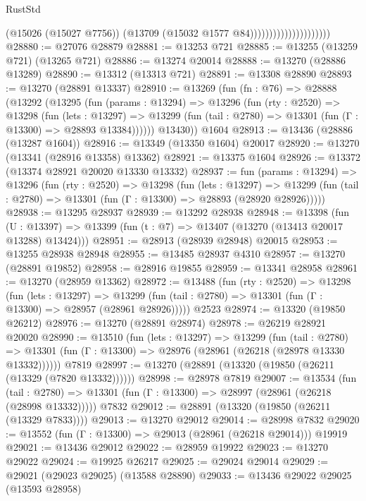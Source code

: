 \begin{lexlean}{RustStd}
\begin{coremodule}
                                          (@15026 (@15027 @7756))
                                          (@13709 (@15032 @1577 @84)))))))))))))))))))))
@28880 := @27076 @28879
@28881 := @13253 @721
@28885 := @13255 (@13259 @721) (@13265 @721)
@28886 := @13274 @20014
@28888 := @13270 (@28886 @13289)
@28890 := @13312 (@13313 @721)
@28891 := @13308 @28890
@28893 := @13270 (@28891 @13337)
@28910 := @13269
    (fun (fn : @76) =>
    @28888
      (@13292
        (@13295
          (fun (params : @13294) =>
          @13296
            (fun (rty : @2520) =>
            @13298
              (fun (lets : @13297) =>
              @13299 (fun (tail : @2780) => @13301 (fun (Γ : @13300) => @28893 @13384))))))
        @13430))
    @1604
@28913 := @13436 (@28886 (@13287 @1604))
@28916 := @13349 (@13350 @1604) @20017
@28920 := @13270 (@13341 (@28916 @13358) @13362)
@28921 := @13375 @1604
@28926 := @13372 (@13374 @28921 @20020 @13330 @13332)
@28937 := fun (params : @13294) =>
  @13296
    (fun (rty : @2520) =>
    @13298
      (fun (lets : @13297) =>
      @13299 (fun (tail : @2780) => @13301 (fun (Γ : @13300) => @28893 (@28920 @28926)))))
@28938 := @13295 @28937
@28939 := @13292 @28938
@28948 := @13398
    (fun (U : @13397) => @13399 (fun (t : @7) => @13407 (@13270 (@13413 @20017 @13288) @13424)))
@28951 := @28913 (@28939 @28948) @20015
@28953 := @13255 @28938 @28948
@28955 := @13485 @28937 @4310
@28957 := @13270 (@28891 @19852)
@28958 := @28916 @19855
@28959 := @13341 @28958
@28961 := @13270 (@28959 @13362)
@28972 := @13488
    (fun (rty : @2520) =>
    @13298
      (fun (lets : @13297) =>
      @13299 (fun (tail : @2780) => @13301 (fun (Γ : @13300) => @28957 (@28961 @28926)))))
    @2523
@28974 := @13320 (@19850 @26212)
@28976 := @13270 (@28891 @28974)
@28978 := @26219 @28921 @20020
@28990 := @13510
    (fun (lets : @13297) =>
    @13299
      (fun (tail : @2780) =>
      @13301 (fun (Γ : @13300) => @28976 (@28961 (@26218 (@28978 @13330 @13332))))))
    @7819
@28997 := @13270 (@28891 (@13320 (@19850 (@26211 (@13329 (@7820 @13332))))))
@28998 := @28978 @7819
@29007 := @13534
    (fun (tail : @2780) => @13301 (fun (Γ : @13300) => @28997 (@28961 (@26218 (@28998 @13332)))))
    @7832
@29012 := @28891 (@13320 (@19850 (@26211 (@13329 @7833))))
@29013 := @13270 @29012
@29014 := @28998 @7832
@29020 := @13552 (fun (Γ : @13300) => @29013 (@28961 (@26218 @29014))) @19919
@29021 := @13436 @29012
@29022 := @28959 @19922
@29023 := @13270 @29022
@29024 := @19925 @26217
@29025 := @29024 @29014
@29029 := @29021 (@29023 @29025) (@13588 @28890)
@29033 := @13436 @29022 @29025 (@13593 @28958)

\end{coremodule}
\end{lexlean}
